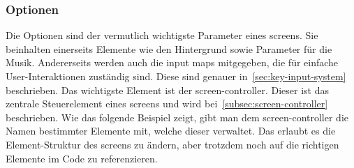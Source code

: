 \subsubsection{Optionen}\label{subsubsec:optionen}
\renewcommand{\kapitelautor}{Autor: Felix Zwickelstorfer}
Die Optionen sind der vermutlich wichtigste Parameter eines screens. 
Sie beinhalten einerseits Elemente wie den Hintergrund sowie Parameter für die Musik.
Andererseits werden auch die input maps mitgegeben, die für einfache User-Interaktionen zuständig sind.
Diese sind genauer in~\ref{sec:key-input-system} beschrieben. 
Das wichtigste Element ist der screen-controller.
Dieser ist das zentrale Steuerelement eines screens und wird bei~\ref{subsec:screen-controller} beschrieben. 
Wie das folgende Beispiel zeigt, gibt man dem screen-controller die Namen bestimmter Elemente mit, welche dieser verwaltet. 
Das erlaubt es die Element-Struktur des screens zu ändern, aber trotzdem noch auf die richtigen Elemente im Code zu referenzieren.

